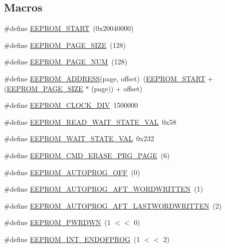 \subsection*{Macros}
\begin{DoxyCompactItemize}
\item 
\#define \hyperlink{group___e_e_p_r_o_m__18_x_x__43_x_x_ga19220ff77b3f420a71eddcfcb2534a52}{E\+E\+P\+R\+O\+M\+\_\+\+S\+T\+A\+RT}~(0x20040000)
\item 
\#define \hyperlink{group___e_e_p_r_o_m__18_x_x__43_x_x_gaddfda15f5f3ec6f8f325f48be50c548a}{E\+E\+P\+R\+O\+M\+\_\+\+P\+A\+G\+E\+\_\+\+S\+I\+ZE}~(128)
\item 
\#define \hyperlink{group___e_e_p_r_o_m__18_x_x__43_x_x_gafb110eded8c7e52bf0826c2bedfd90cd}{E\+E\+P\+R\+O\+M\+\_\+\+P\+A\+G\+E\+\_\+\+N\+UM}~(128)
\item 
\#define \hyperlink{group___e_e_p_r_o_m__18_x_x__43_x_x_ga7ee5cba0bfcfb004dfba1245a977c216}{E\+E\+P\+R\+O\+M\+\_\+\+A\+D\+D\+R\+E\+SS}(page,  offset)~(\hyperlink{group___e_e_p_r_o_m__18_x_x__43_x_x_ga19220ff77b3f420a71eddcfcb2534a52}{E\+E\+P\+R\+O\+M\+\_\+\+S\+T\+A\+RT} + (\hyperlink{group___e_e_p_r_o_m__18_x_x__43_x_x_gaddfda15f5f3ec6f8f325f48be50c548a}{E\+E\+P\+R\+O\+M\+\_\+\+P\+A\+G\+E\+\_\+\+S\+I\+ZE} $\ast$ (page)) + offset)
\item 
\#define \hyperlink{group___e_e_p_r_o_m__18_x_x__43_x_x_gad60e60fac4934de0ea5ad45fc6035fbc}{E\+E\+P\+R\+O\+M\+\_\+\+C\+L\+O\+C\+K\+\_\+\+D\+IV}~1500000
\item 
\#define \hyperlink{group___e_e_p_r_o_m__18_x_x__43_x_x_gae7c4f0b2db03d7cd7a036158e88346b8}{E\+E\+P\+R\+O\+M\+\_\+\+R\+E\+A\+D\+\_\+\+W\+A\+I\+T\+\_\+\+S\+T\+A\+T\+E\+\_\+\+V\+AL}~0x58
\item 
\#define \hyperlink{group___e_e_p_r_o_m__18_x_x__43_x_x_ga33a1933987e17e85216abe94ff29e4d3}{E\+E\+P\+R\+O\+M\+\_\+\+W\+A\+I\+T\+\_\+\+S\+T\+A\+T\+E\+\_\+\+V\+AL}~0x232
\item 
\#define \hyperlink{group___e_e_p_r_o_m__18_x_x__43_x_x_ga6d6a26f6d387d9bc636c56c07994f0b6}{E\+E\+P\+R\+O\+M\+\_\+\+C\+M\+D\+\_\+\+E\+R\+A\+S\+E\+\_\+\+P\+R\+G\+\_\+\+P\+A\+GE}~(6)
\item 
\#define \hyperlink{group___e_e_p_r_o_m__18_x_x__43_x_x_ga3b420badc39c2adf9780d44a74faa45a}{E\+E\+P\+R\+O\+M\+\_\+\+A\+U\+T\+O\+P\+R\+O\+G\+\_\+\+O\+FF}~(0)
\item 
\#define \hyperlink{group___e_e_p_r_o_m__18_x_x__43_x_x_ga707dd1e49eb23a4e804d58d2d19bba52}{E\+E\+P\+R\+O\+M\+\_\+\+A\+U\+T\+O\+P\+R\+O\+G\+\_\+\+A\+F\+T\+\_\+W\+O\+R\+D\+W\+R\+I\+T\+T\+EN}~(1)
\item 
\#define \hyperlink{group___e_e_p_r_o_m__18_x_x__43_x_x_ga6c353fc9ef8b0be089c548ccd58c6388}{E\+E\+P\+R\+O\+M\+\_\+\+A\+U\+T\+O\+P\+R\+O\+G\+\_\+\+A\+F\+T\+\_\+\+L\+A\+S\+T\+W\+O\+R\+D\+W\+R\+I\+T\+T\+EN}~(2)
\item 
\#define \hyperlink{group___e_e_p_r_o_m__18_x_x__43_x_x_ga71f23d0464d767653aad1e73d30a14dc}{E\+E\+P\+R\+O\+M\+\_\+\+P\+W\+R\+D\+WN}~(1 $<$$<$ 0)
\item 
\#define \hyperlink{group___e_e_p_r_o_m__18_x_x__43_x_x_ga6cbd8a7a267a151c2d6d324d2bac4eea}{E\+E\+P\+R\+O\+M\+\_\+\+I\+N\+T\+\_\+\+E\+N\+D\+O\+F\+P\+R\+OG}~(1 $<$$<$ 2)
\end{DoxyCompactItemize}
